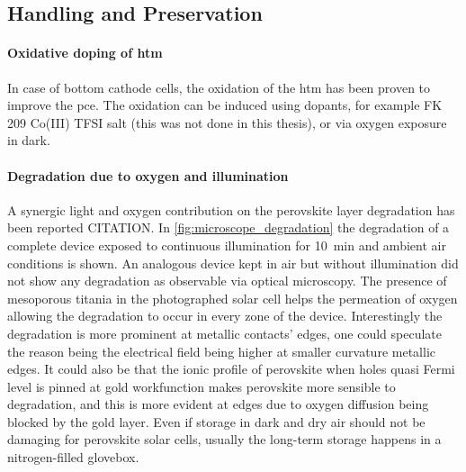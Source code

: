 \FloatBarrier
\subsection{Handling and Preservation}

\paragraph{Oxidative doping of \gls{htm}} In case of bottom cathode cells, the oxidation of the \gls{htm} has been proven to improve the \gls{pce}. The oxidation can be induced using dopants, for example FK 209 Co(III) TFSI salt\cite{Burschka2013} (this was not done in this thesis), or via oxygen exposure in dark.

\paragraph{Degradation due to oxygen and illumination}  A synergic light and oxygen contribution on the perovskite layer degradation has been reported CITATION. In \cref{fig:microscope_degradation} the degradation of a complete device exposed to continuous illumination for \SI{10}{\minute} and ambient air conditions is shown. An analogous device kept in air but without illumination did not show any degradation as observable via optical microscopy. The presence of mesoporous titania in the photographed solar cell helps the permeation of oxygen allowing the degradation to occur in every zone of the device.
Interestingly the degradation is more prominent at metallic contacts' edges, one could speculate the reason being the electrical field being higher at smaller curvature metallic edges. It could also be that the ionic profile of perovskite when holes quasi Fermi level is pinned at gold workfunction makes perovskite more sensible to degradation, and this is more evident at edges due to oxygen diffusion being blocked by the gold layer.
Even if storage in dark and dry air should not be damaging for perovskite solar cells, usually the long-term storage happens in a nitrogen-filled glovebox.


